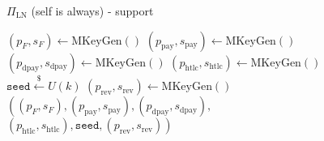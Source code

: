 \begin{figure}[!htbp]
\begin{protocolbox}{$\Pi_{\mathrm{LN}}$ (self is \alice{} always) - support}
\begin{algorithmic}[1]
     
      \State $\left(p_F, s_F\right) \gets \mathrm{MKeyGen}\left(\right)$
      \State $\left(p_{\mathrm{pay}}, s_{\mathrm{pay}}\right) \gets
      \mathrm{MKeyGen}\left(\right)$ 
      \State $\left(p_{\mathrm{dpay}}, s_{\mathrm{dpay}}\right) \gets
      \mathrm{MKeyGen}\left(\right)$ 
      \State $\left(p_{\mathrm{htlc}}, s_{\mathrm{htlc}}\right) \gets
      \mathrm{MKeyGen}\left(\right)$ 
      \State $\texttt{seed} \overset{\$}{\gets} U(k)$ 
      \State $\left(p_{\mathrm{rev}}, s_{\mathrm{rev}}\right) \gets
      \mathrm{MKeyGen}\left(\right)$ 
      \State \Return $\left(\left(p_F, s_F\right), \left(p_{\mathrm{pay}},
      s_{\mathrm{pay}}\right), \left(p_{\mathrm{dpay}},
      s_{\mathrm{dpay}}\right),\right.$
      \Indent
        \State $\left.\left(p_{\mathrm{htlc}}, s_{\mathrm{htlc}}\right),
        \mathtt{seed}, \left(p_{\mathrm{rev}}, s_{\mathrm{rev}}\right)\right)$
      \EndIndent
    \EndFunction
  \end{algorithmic}
\end{protocolbox}
\caption{}
\label{alg:protocol:support}
\end{figure}

